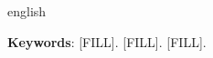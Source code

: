 \begin{resumo}[Abstract]
  \begin{otherlanguage*}{english}

\vspace{\onelineskip}
\noindent\textbf{Keywords}: [FILL]. [FILL]. [FILL].
  \end{otherlanguage*}
\end{resumo}
